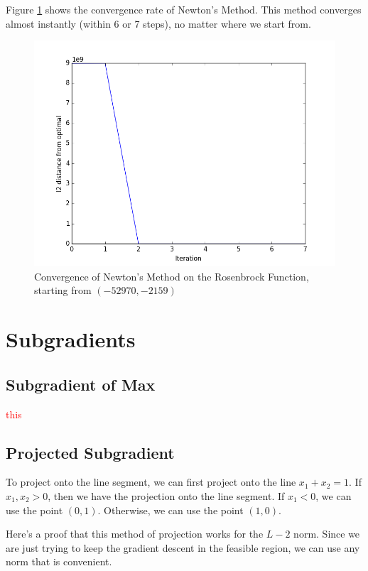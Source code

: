 \documentclass{article}
\newcommand\todo[1]{\textcolor{red}{#1}}
\begin{document}
Figure \ref{fig:rosenbrock-newtons} shows the convergence rate of Newton's Method. This method converges almost instantly (within 6 or 7 steps), no matter where we start from.

\begin{figure}[!ht]
  \centering
  \includegraphics[width=\textwidth,keepaspectratio=true]{rosenbrock-newtons.png}
  \caption{Convergence of Newton's Method on the Rosenbrock Function, starting from $(-52970, -2159)$}
  \label{fig:rosenbrock-newtons}
\end{figure}

\section{Subgradients}

\subsection{Subgradient of Max}

\todo{this}

\subsection{Projected Subgradient}

To project onto the line segment, we can first project onto the line $x_1 + x_2 = 1$. If $x_1,x_2 > 0$, then we have the projection onto the line segment. If $x_1 < 0$, we can use the point $(0, 1)$. Otherwise, we can use the point $(1, 0)$.

Here's a proof that this method of projection works for the $L-2$ norm. Since we are just trying to keep the gradient descent in the feasible region, we can use any norm that is convenient.
\end{document}
